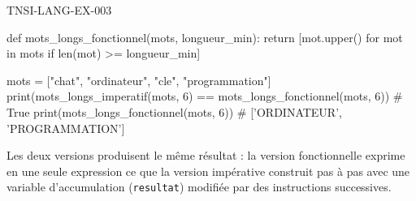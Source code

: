 \begin{corrige}{TNSI-LANG-EX-003}
\begin{python}
def mots_longs_fonctionnel(mots, longueur_min):
    return [mot.upper() for mot in mots if len(mot) >= longueur_min]
\end{python}
\begin{python}
mots = ["chat", "ordinateur", "cle", "programmation"]
print(mots_longs_imperatif(mots, 6) == mots_longs_fonctionnel(mots, 6))  # True
print(mots_longs_fonctionnel(mots, 6))  # ['ORDINATEUR', 'PROGRAMMATION']
\end{python}
Les deux versions produisent le même résultat : la version fonctionnelle exprime en une seule expression ce que la version impérative construit pas à pas avec une variable d'accumulation (\lstinline{resultat}) modifiée par des instructions successives.
\end{corrige}
